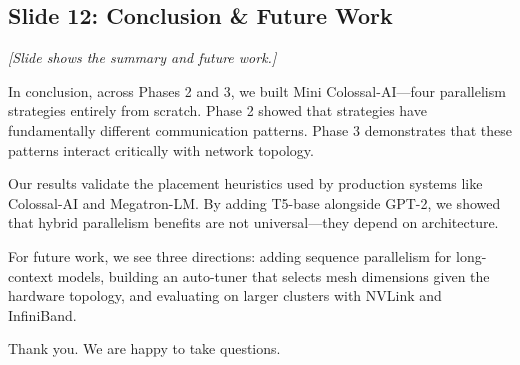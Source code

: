 \documentclass[11pt, a4paper]{article}
\begin{document}
\subsection{Slide 12: Conclusion \& Future Work}
\textit{[Slide shows the summary and future work.]}

In conclusion, across Phases 2 and 3, we built Mini Colossal-AI---four parallelism strategies entirely from scratch. Phase 2 showed that strategies have fundamentally different communication patterns. Phase 3 demonstrates that these patterns interact critically with network topology.

Our results validate the placement heuristics used by production systems like Colossal-AI and Megatron-LM. By adding T5-base alongside GPT-2, we showed that hybrid parallelism benefits are not universal---they depend on architecture.

For future work, we see three directions: adding sequence parallelism for long-context models, building an auto-tuner that selects mesh dimensions given the hardware topology, and evaluating on larger clusters with NVLink and InfiniBand.

Thank you. We are happy to take questions.
\end{document}

